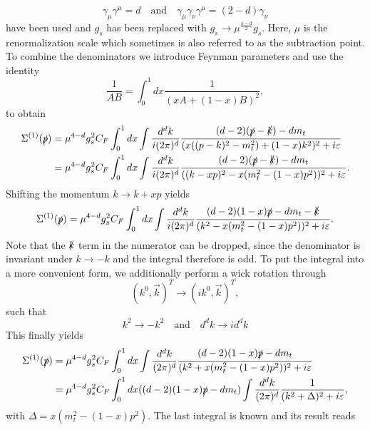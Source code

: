 \documentclass[a4paper,12pt]{book}
\begin{document}
\begin{appendices}
\begin{equation}
\gamma_\mu \gamma^\mu = d \quad \text{and} \quad
\gamma_\mu \gamma_\nu \gamma^\mu = (2-d)\gamma_\nu
\end{equation}
have been used and $g_s$ has been replaced with $g_s \rightarrow \mu^{\frac{4-d}{2}} g_s$. Here, $\mu$ is the renormalization scale which sometimes is also referred to as the subtraction point. To combine the denominators we introduce Feynman parameters and use the identity
\begin{equation}
\frac{1}{AB}=\int^1_0 dx \frac{1}{(xA+(1-x)B)^2},
\end{equation}
to obtain
\begin{align}
\Sigma^{(1)}(\slashed{p})&=\mu^{4-d}g_s^2 C_F \int^1_0 dx \int \frac{d^dk}{i(2\pi)^d} \frac{(d-2)(\slashed{p}-\slashed{k})-d m_t}{(x((p-k)^2-m_t^2)+(1-x)k^2)^2+i\varepsilon}\\
&=\mu^{4-d}g_s^2 C_F \int^1_0 dx \int \frac{d^dk}{i(2\pi)^d} \frac{(d-2)(\slashed{p}-\slashed{k})-d m_t}{((k-xp)^2-x(m_t^2-(1-x)p^2))^2+i\varepsilon}.
\end{align}
Shifting the momentum $k \rightarrow k+xp$ yields
\begin{equation}
\Sigma^{(1)}(\slashed{p})=\mu^{4-d}g_s^2 C_F \int^1_0 dx \int \frac{d^dk}{i(2\pi)^d} \frac{(d-2)(1-x)\slashed{p}-d m_t-\slashed{k}}{(k^2-x(m_t^2-(1-x)p^2))^2+i\varepsilon}.
\end{equation}
Note that the $\slashed{k}$ term in the numerator can be dropped, since the denominator is invariant under $k \rightarrow -k$ and the integral therefore is odd. To put the integral into a more convenient form, we additionally perform a wick rotation through 
\begin{equation}
(k^0,\vec{k})^T \rightarrow (ik^0,\vec{k})^T,
\end{equation}
such that 
\begin{equation}
k^2 \rightarrow -k^2 \quad \text{and} \quad d^dk \rightarrow i d^dk
\end{equation}
This finally yields
\begin{align}
\Sigma^{(1)}(\slashed{p})&=\mu^{4-d}g_s^2 C_F \int^1_0 dx \int \frac{d^dk}{(2\pi)^d} \frac{(d-2)(1-x)\slashed{p}-d m_t}{(k^2+x(m_t^2-(1-x)p^2))^2+i\varepsilon}\\ 
&= \mu^{4-d}g_s^2 C_F \int^1_0 dx ((d-2)(1-x)\slashed{p}-d m_t) \int \frac{d^dk}{(2\pi)^d} \frac{1}{(k^2+\Delta)^2+i\varepsilon},
\end{align}
with $\Delta = x(m_t^2-(1-x)p^2)$.
The last integral is known and its result reads

\end{appendices}
\end{document}
